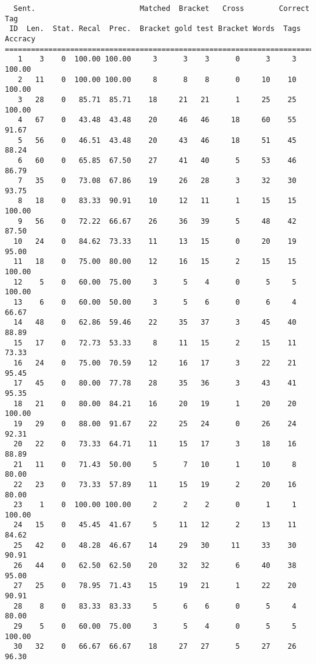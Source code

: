 \scriptsize
\begin{verbatim}
  Sent.                        Matched  Bracket   Cross        Correct Tag
 ID  Len.  Stat. Recal  Prec.  Bracket gold test Bracket Words  Tags Accracy
============================================================================
   1    3    0  100.00 100.00     3      3    3      0      3     3   100.00
   2   11    0  100.00 100.00     8      8    8      0     10    10   100.00
   3   28    0   85.71  85.71    18     21   21      1     25    25   100.00
   4   67    0   43.48  43.48    20     46   46     18     60    55    91.67
   5   56    0   46.51  43.48    20     43   46     18     51    45    88.24
   6   60    0   65.85  67.50    27     41   40      5     53    46    86.79
   7   35    0   73.08  67.86    19     26   28      3     32    30    93.75
   8   18    0   83.33  90.91    10     12   11      1     15    15   100.00
   9   56    0   72.22  66.67    26     36   39      5     48    42    87.50
  10   24    0   84.62  73.33    11     13   15      0     20    19    95.00
  11   18    0   75.00  80.00    12     16   15      2     15    15   100.00
  12    5    0   60.00  75.00     3      5    4      0      5     5   100.00
  13    6    0   60.00  50.00     3      5    6      0      6     4    66.67
  14   48    0   62.86  59.46    22     35   37      3     45    40    88.89
  15   17    0   72.73  53.33     8     11   15      2     15    11    73.33
  16   24    0   75.00  70.59    12     16   17      3     22    21    95.45
  17   45    0   80.00  77.78    28     35   36      3     43    41    95.35
  18   21    0   80.00  84.21    16     20   19      1     20    20   100.00
  19   29    0   88.00  91.67    22     25   24      0     26    24    92.31
  20   22    0   73.33  64.71    11     15   17      3     18    16    88.89
  21   11    0   71.43  50.00     5      7   10      1     10     8    80.00
  22   23    0   73.33  57.89    11     15   19      2     20    16    80.00
  23    1    0  100.00 100.00     2      2    2      0      1     1   100.00
  24   15    0   45.45  41.67     5     11   12      2     13    11    84.62
  25   42    0   48.28  46.67    14     29   30     11     33    30    90.91
  26   44    0   62.50  62.50    20     32   32      6     40    38    95.00
  27   25    0   78.95  71.43    15     19   21      1     22    20    90.91
  28    8    0   83.33  83.33     5      6    6      0      5     4    80.00
  29    5    0   60.00  75.00     3      5    4      0      5     5   100.00
  30   32    0   66.67  66.67    18     27   27      5     27    26    96.30

\end{verbatim}
